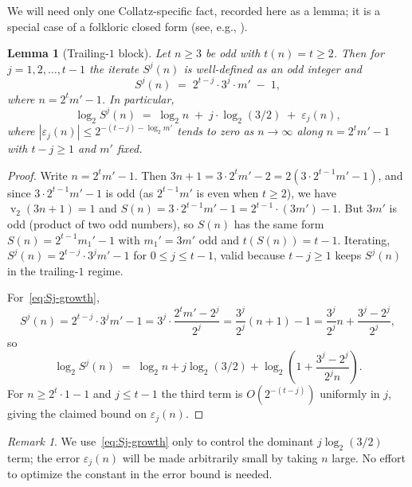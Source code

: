 \documentclass[11pt,a4paper]{article}
\newtheorem{lemma}[theorem]{Lemma}
\theoremstyle{definition}
\theoremstyle{remark}
\newtheorem{remark}[theorem]{Remark}
\DeclareMathOperator{\val}{v}
\begin{document}
We will need only one Collatz-specific fact, recorded here as a lemma;
it is a special case of a folkloric closed form (see, e.g.,
\cite[Lemma~2.1]{Lagarias1985}).

\begin{lemma}[Trailing-$1$ block]\label{lem:trailing}
Let $n \geq 3$ be odd with $t(n) = t \geq 2$.  Then for $j = 1, 2,
\dots, t-1$ the iterate $S^j(n)$ is well-defined as an odd integer and
\[
  S^j(n) \;=\; 2^{t - j} \cdot 3^j \cdot m' \;-\; 1,
\]
where $n = 2^t m' - 1$.  In particular,
\begin{equation}\label{eq:Sj-growth}
  \log_2 S^j(n) \;=\; \log_2 n \;+\; j \cdot \log_2(3/2)
  \;+\; \varepsilon_j(n),
\end{equation}
where $|\varepsilon_j(n)| \leq 2^{-(t - j) - \log_2 m'}$ tends to zero
as $n \to \infty$ along $n = 2^t m' - 1$ with $t - j \geq 1$ and $m'$
fixed.
\end{lemma}

\begin{proof}
Write $n = 2^t m' - 1$.  Then $3n + 1 = 3 \cdot 2^t m' - 2 = 2(3 \cdot
2^{t-1} m' - 1)$, and since $3 \cdot 2^{t-1} m' - 1$ is odd (as
$2^{t-1} m'$ is even when $t \geq 2$), we have $\val_2(3n+1) = 1$ and
$S(n) = 3 \cdot 2^{t-1} m' - 1 = 2^{t-1} \cdot (3 m') - 1$.  But
$3 m'$ is odd (product of two odd numbers), so $S(n)$ has the same
form $S(n) = 2^{t - 1} m_1' - 1$ with $m_1' = 3 m'$ odd and
$t(S(n)) = t - 1$.  Iterating,
$S^j(n) = 2^{t - j} \cdot 3^j m' - 1$ for $0 \leq j \leq t - 1$, valid
because $t - j \geq 1$ keeps $S^j(n)$ in the trailing-$1$ regime.

For~\eqref{eq:Sj-growth},
\[
  S^j(n) = 2^{t-j} \cdot 3^j m' - 1
  = 3^j \cdot \frac{2^t m' - 2^j}{2^j}
  = \frac{3^j}{2^j} (n + 1) - 1
  = \frac{3^j}{2^j} n + \frac{3^j - 2^j}{2^j},
\]
so
\[
  \log_2 S^j(n) \;=\; \log_2 n + j \log_2(3/2)
  + \log_2\!\left(1 + \frac{3^j - 2^j}{2^j n}\right).
\]
For $n \geq 2^t \cdot 1 - 1$ and $j \leq t - 1$ the third term is
$O(2^{-(t-j)})$ uniformly in $j$, giving the claimed bound on
$\varepsilon_j(n)$.
\end{proof}

\begin{remark}
We use~\eqref{eq:Sj-growth} only to control the dominant
$j \log_2(3/2)$ term; the error $\varepsilon_j(n)$ will be made
arbitrarily small by taking $n$ large.  No effort to optimize the
constant in the error bound is needed.
\end{remark}

\end{document}
